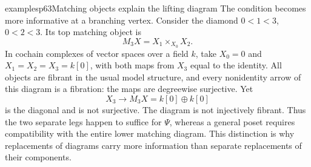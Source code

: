 \begin{dcomment}{examples}{p63}{Matching objects explain the lifting diagram}
The condition becomes more informative at a branching vertex. Consider the diamond $0<1<3$, $0<2<3$. Its top matching object is
\[
                           M_3X=X_1\times_{X_0}X_2.
\]
In cochain complexes of vector spaces over a field $k$, take $X_0=0$ and $X_1=X_2=X_3=k[0]$, with both maps from $X_3$ equal to the identity. All objects are fibrant in the usual model structure, and every nonidentity arrow of this diagram is a fibration: the maps are degreewise surjective. Yet
\[
                  X_3\longrightarrow M_3X=k[0]\oplus k[0]
\]
is the diagonal and is not surjective. The diagram is not injectively fibrant. Thus the two separate legs happen to suffice for $\Psi$, whereas a general poset requires compatibility with the entire lower matching diagram. This distinction is why replacements of diagrams carry more information than separate replacements of their components.
\end{dcomment}

